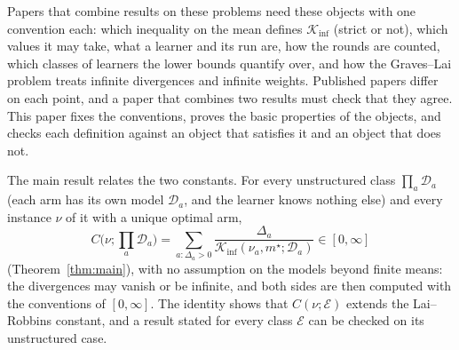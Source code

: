 \documentclass[11pt]{article}
\begin{document}
Papers that combine results on these problems need these objects with one convention each: which
inequality on the mean defines $\mathcal K_{\inf}$ (strict or not), which values it may take, what
a learner and its run are, how the rounds are counted, which classes of learners the lower bounds
quantify over, and how the Graves--Lai problem treats infinite divergences and infinite weights.
Published papers differ on each point, and a paper that combines two results must check that
they agree. This paper fixes the conventions, proves the basic properties of the objects, and
checks each definition against an object that satisfies it and an object that does not.

The main result relates the two constants. For every unstructured class $\prod_a\mathcal D_a$
(each arm has its own model $\mathcal D_a$, and the learner knows nothing else) and every instance
$\nu$ of it with a unique optimal arm,
\begin{equation*}
  C\Big(\nu;\prod_{a}\mathcal D_a\Big)=\sum_{a:\Delta_a>0}\frac{\Delta_a}{\mathcal K_{\inf}(\nu_a,m^\star;\mathcal D_a)}\in[0,\infty]
\end{equation*}
(Theorem~\ref{thm:main}), with no assumption on the models beyond finite means: the divergences
may vanish or be infinite, and both sides are then computed with the conventions of
$[0,\infty]$. The identity shows that $C(\nu;\mathcal E)$ extends the Lai--Robbins constant, and a
result stated for every class $\mathcal E$ can be checked on its unstructured case.
\end{document}

